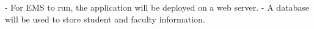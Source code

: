   - For EMS to run, the application will be deployed on a web server. 
  - A database will be used to store student and faculty information.
